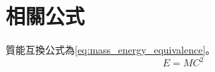\chapter{相關公式}
\label{chapter:appendix_eq}

    質能互換公式為\eqref{eq:mass_energy_equivalence}。
    \begin{equation}\label{eq:mass_energy_equivalence}
      E=MC^2
    \end{equation}


